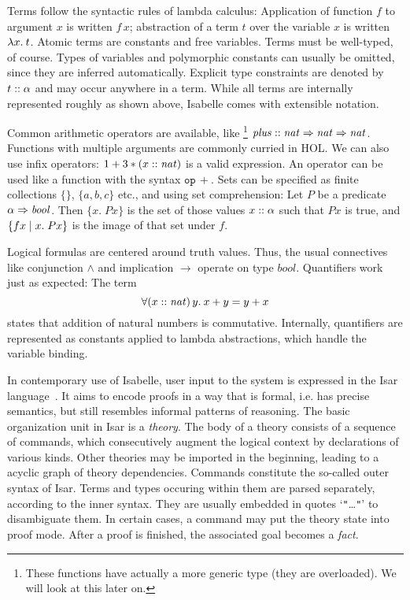Terms follow the syntactic rules of lambda calculus:
Application of function $f$ to argument $x$ is written $f\,x$;
abstraction of a term $t$ over the variable $x$ is written $\lambda x.\>t$.
Atomic terms are constants and free variables.
Terms must be well-typed, of course.
Types of variables and polymorphic constants can usually be omitted, since
they are inferred automatically.
Explicit type constraints are denoted by $t \mathrel{::} \alpha$ and may occur
anywhere in a term.
While all terms are internally represented roughly as shown above, Isabelle
comes with extensible notation.

\begin{example}\label{exmp:hol-terms}
Common arithmetic operators are available, like%
\footnote{These functions have actually a more generic type (they are
overloaded). We will look at this later on.}
$\mathit{plus} \mathrel{::} \mathit{nat} \Rightarrow \mathit{nat} \Rightarrow \mathit{nat}$.
Functions with multiple arguments are commonly curried in HOL.
We can also use infix operators: $1 + 3 * (x \mathrel{::} \mathit{nat})$ is a
valid expression.
An operator can be used like a function with the syntax $\mathtt{op}\,+$.
Sets can be specified as finite collections $\{\}$, $\{a, b, c\}$ etc., and
using set comprehension:
Let $P$ be a predicate $\alpha \Rightarrow \mathit{bool}$.
Then $\{x.\; P x\}$ is the set of those values $x \mathrel{::} \alpha$ such that
$P x$ is true, and $\{f x\mid x.\; P x\}$ is the image of that set under $f$.

Logical formulas are centered around truth values.
Thus, the usual connectives like conjunction $\land$ and implication
$\longrightarrow$ operate on type $\mathit{bool}$.
Quantifiers work just as expected: The term
\[ \forall (x \mathrel{::} \mathit{nat})\,y.\>x + y = y + x \]
states that addition of natural numbers is commutative.
Internally, quantifiers are represented as constants applied to lambda
abstractions, which handle the variable binding.
\end{example}

In contemporary use of Isabelle, user input to the system is expressed in
the Isar language~\cite{wenzel99,wenzel02,isar-ref}.
It aims to encode proofs in a way that is formal, i.e. has precise semantics,
but still resembles informal patterns of reasoning.
The basic organization unit in Isar is a \emph{theory}.
The body of a theory consists of a sequence of commands, which consecutively
augment the logical context by declarations of various kinds.
Other theories may be imported in the beginning, leading to a acyclic graph
of theory dependencies.
Commands constitute the so-called outer syntax of Isar.
Terms and types occuring within them are parsed separately, according to the
inner syntax.
They are usually embedded in quotes `\texttt{"}\dots\texttt{"}' to disambiguate
them.
In certain cases, a command may put the theory state into proof mode.
After a proof is finished, the associated goal becomes a \emph{fact}.

